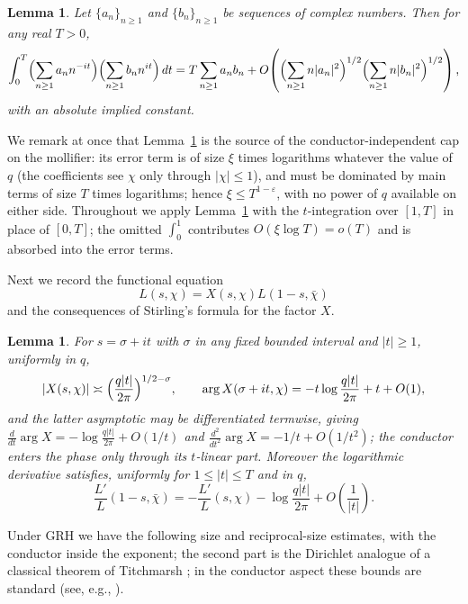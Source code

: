 \documentclass[12pt,a4paper,reqno]{amsart}
\newtheorem{lemma}[theorem]{Lemma}
\theoremstyle{remark}
\numberwithin{equation}{section}
\begin{document}
\begin{lemma}\label{lem:MV}
Let $\{a_n\}_{n\ge1}$ and $\{b_n\}_{n\ge1}$ be sequences of complex numbers. Then for any real $T>0$,
\[
\int_0^T\Bigl(\sum_{n\ge1}a_n n^{-it}\Bigr)\Bigl(\sum_{n\ge1}b_n n^{it}\Bigr)\,dt
=T\sum_{n\ge1}a_n b_n+O\!\left(\Bigl(\sum_{n\ge1}n|a_n|^2\Bigr)^{1/2}\Bigl(\sum_{n\ge1}n|b_n|^2\Bigr)^{1/2}\right),
\]
with an absolute implied constant.
\end{lemma}

We remark at once that Lemma~\ref{lem:MV} is the source of the conductor-independent cap on the mollifier: its error term is of size $\xi$ times logarithms whatever the value of $q$ (the coefficients see $\chi$ only through $|\chi|\le1$), and must be dominated by main terms of size $T$ times logarithms; hence $\xi\le T^{1-\varepsilon}$, with no power of $q$ available on either side. Throughout we apply Lemma~\ref{lem:MV} with the $t$-integration over $[1,T]$ in place of $[0,T]$; the omitted $\int_0^1$ contributes $O(\xi\log T)=o(T)$ and is absorbed into the error terms.

Next we record the functional equation
\begin{equation}\label{eq:FE}
L(s,\chi)=X(s,\chi)L(1-s,\bar\chi)
\end{equation}
and the consequences of Stirling's formula for the factor $X$.

\begin{lemma}\label{lem:Xfactor}
For $s=\sigma+it$ with $\sigma$ in any fixed bounded interval and $|t|\ge1$, uniformly in $q$,
\[
|X(s,\chi)|\asymp\Bigl(\frac{q|t|}{2\pi}\Bigr)^{1/2-\sigma},
\qquad
\arg X(\sigma+it,\chi)=-t\log\frac{q|t|}{2\pi}+t+O(1),
\]
and the latter asymptotic may be differentiated termwise, giving $\frac{d}{dt}\arg X=-\log\frac{q|t|}{2\pi}+O(1/t)$ and $\frac{d^2}{dt^2}\arg X=-1/t+O(1/t^2)$; the conductor enters the phase only through its $t$-linear part. Moreover the logarithmic derivative satisfies, uniformly for $1\le|t|\le T$ and in $q$,
\[
\frac{L'}{L}(1-s,\bar\chi)=-\frac{L'}{L}(s,\chi)-\log\frac{q|t|}{2\pi}+O\!\left(\frac1{|t|}\right).
\]
\end{lemma}

Under GRH we have the following size and reciprocal-size estimates, with the conductor inside the exponent; the second part is the Dirichlet analogue of a classical theorem of Titchmarsh \cite[Theorem~14.16]{Titchmarsh}; in the conductor aspect these bounds are standard (see, e.g., \cite[Ch.~5]{IK}).
\end{document}
